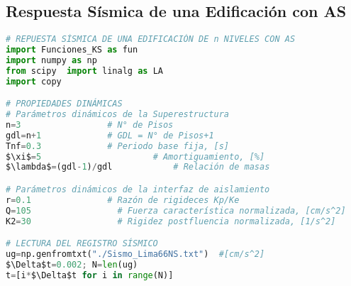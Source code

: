 \subsection*{Respuesta Sísmica de una Edificación con AS}
{}

\begin{MyFont}
\begin{adjustwidth}{4.8mm}{}
\begin{lstlisting}[language=Python, caption= {\footnotesize Edificación con aislamiento sísmico bilineal}, mathescape=true,label={Algoritmo1}]
# REPUESTA SÍSMICA DE UNA EDIFICACIÓN DE n NIVELES CON AS
import Funciones_KS as fun
import numpy as np
from scipy  import linalg as LA
import copy

# PROPIEDADES DINÁMICAS
# Parámetros dinámicos de la Superestructura
n=3                 # N° de Pisos
gdl=n+1             # GDL = N° de Pisos+1
Tnf=0.3             # Periodo base fija, [s]
$\xi$=5           			 # Amortiguamiento, [%]
$\lambda$=(gdl-1)/gdl 			 # Relación de masas

# Parámetros dinámicos de la interfaz de aislamiento
r=0.1               # Razón de rigideces Kp/Ke
Q=105          		  # Fuerza característica normalizada, [cm/s^2]
K2=30         		  # Rigidez postfluencia normalizada, [1/s^2]

# LECTURA DEL REGISTRO SÍSMICO
ug=np.genfromtxt("./Sismo_Lima66NS.txt")  #[cm/s^2]
$\Delta$t=0.002; N=len(ug)
t=[i*$\Delta$t for i in range(N)]

\end{lstlisting}
\end{adjustwidth}
\end{MyFont}

